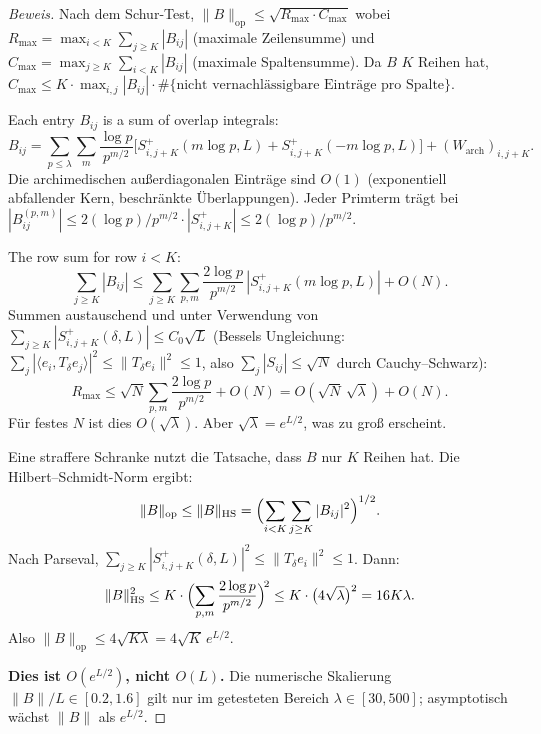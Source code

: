 \documentclass[12pt,a4paper]{article}
\theoremstyle{definition}
\theoremstyle{remark}
\begin{document}
\begin{proof}[Beweis]
Nach dem Schur-Test, $\|B\|_{\mathrm{op}} \leq \sqrt{R_{\max}\cdot C_{\max}}$ wobei $R_{\max} = \max_{i < K}\sum_{j \geq K}|B_{ij}|$ (maximale Zeilensumme) und $C_{\max} = \max_{j \geq K}\sum_{i < K}|B_{ij}|$ (maximale Spaltensumme). Da $B$ $K$ Reihen hat, $C_{\max} \leq K \cdot \max_{i,j}|B_{ij}| \cdot \#\{\text{nicht vernachlässigbare Einträge pro Spalte}\}$.

Each entry $B_{ij}$ is a sum of overlap integrals:
\[
  B_{ij} = \sum_{p \leq \lambda}\sum_m \frac{\log p}{p^{m/2}}\bigl[S_{i,j+K}^+(m\log p, L) + S_{i,j+K}^+(-m\log p, L)\bigr] + (W_{\mathrm{arch}})_{i,j+K}.
\]
Die archimedischen außerdiagonalen Einträge sind $O(1)$ (exponentiell abfallender Kern, beschränkte Überlappungen). Jeder Primterm trägt bei
$|B_{ij}^{(p,m)}| \leq 2(\log p)/p^{m/2} \cdot |S_{i,j+K}^+| \leq 2(\log p)/p^{m/2}$.

The row sum for row $i < K$:
\[
  \sum_{j \geq K}|B_{ij}|
  \leq \sum_{j \geq K}\sum_{p,m}\frac{2\log p}{p^{m/2}}\,|S_{i,j+K}^+(m\log p, L)| + O(N).
\]
Summen austauschend und unter Verwendung von $\sum_{j \geq K} |S_{i,j+K}^+(\delta, L)| \leq C_0\sqrt{L}$ (Bessels Ungleichung: $\sum_j |\langle e_i, T_\delta e_j\rangle|^2 \leq \|T_\delta e_i\|^2 \leq 1$, also $\sum_j |S_{ij}| \leq \sqrt{N}$ durch Cauchy--Schwarz):
\[
  R_{\max} \leq \sqrt{N}\sum_{p,m}\frac{2\log p}{p^{m/2}} + O(N) = O(\sqrt{N}\,\sqrt{\lambda}) + O(N).
\]
Für festes $N$ ist dies $O(\sqrt{\lambda})$. Aber $\sqrt{\lambda} = e^{L/2}$, was zu groß erscheint.

Eine straffere Schranke nutzt die Tatsache, dass $B$ nur $K$ Reihen hat. Die Hilbert--Schmidt-Norm ergibt:
\[
  \|B\|_{\mathrm{op}} \leq \|B\|_{\mathrm{HS}} = \Bigl(\sum_{i < K}\sum_{j \geq K}|B_{ij}|^2\Bigr)^{1/2}.
\]
Nach Parseval, $\sum_{j \geq K} |S_{i,j+K}^+(\delta,L)|^2 \leq \|T_\delta e_i\|^2 \leq 1$. Dann:
\[
  \|B\|_{\mathrm{HS}}^2
  \leq K\cdot\Bigl(\sum_{p,m}\frac{2\log p}{p^{m/2}}\Bigr)^{\!2}
  \leq K\cdot\bigl(4\sqrt{\lambda}\bigr)^2 = 16K\lambda.
\]
Also $\|B\|_{\mathrm{op}} \leq 4\sqrt{K\lambda} = 4\sqrt{K}\,e^{L/2}$.

\textbf{Dies ist $O(e^{L/2})$, nicht $O(L)$.} Die numerische Skalierung $\|B\|/L \in [0.2, 1.6]$ gilt nur im getesteten Bereich $\lambda \in [30, 500]$; asymptotisch wächst $\|B\|$ als $e^{L/2}$.
\end{proof}
\end{document}
